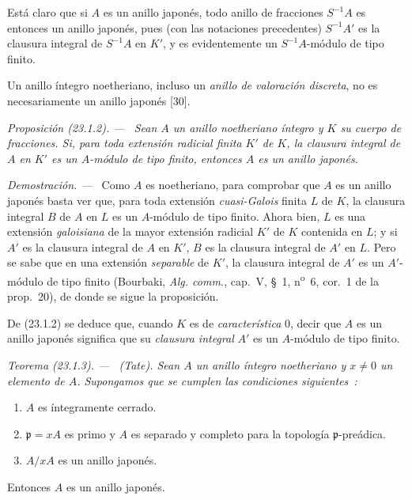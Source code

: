 \documentclass[10pt,oneside]{book}
\makeatletter
\newcommand{\setmanualcurrentlabel}[1]{\def\@currentlabel{#1}}
\newenvironment{proposition}[1][]{%
  \setmanualcurrentlabel{#1}\par\medskip\noindent\itshape Proposición (#1). ---\ }{\par}
\newenvironment{theorem}[1][]{%
  \setmanualcurrentlabel{#1}\par\medskip\noindent\itshape Teorema (#1). ---\ }{\par}
\newenvironment{proof}{%
  \par\medskip\noindent\textit{Demostración. ---\ }}{\par}
\makeatother
\begin{document}
Está claro que si $A$ es un anillo japonés, todo anillo de fracciones
$S^{-1}A$ es entonces un anillo japonés, pues (con las notaciones precedentes)
$S^{-1}A'$ es la clausura integral de $S^{-1}A$ en $K'$, y es
evidentemente un $S^{-1}A$-módulo de tipo finito.

Un anillo íntegro noetheriano, incluso un \emph{anillo de valoración discreta},
no es necesariamente un anillo japonés [30].

\begin{proposition}[23.1.2]
\label{0.23.1.2-es}
Sean $A$ un anillo noetheriano íntegro y $K$ su cuerpo de fracciones. Si, para
toda extensión \textup{radicial} finita $K'$ de $K$, la clausura integral de $A$
en $K'$ es un $A$-módulo de tipo finito, entonces $A$ es un anillo japonés.
\end{proposition}

\begin{proof}
Como $A$ es noetheriano, para comprobar que $A$ es un anillo japonés basta
ver que, para toda extensión \emph{cuasi-Galois} finita $L$ de $K$, la clausura
integral $B$ de $A$ en $L$ es un $A$-módulo de tipo
finito. Ahora bien, $L$ es
una extensión \emph{galoisiana} de la mayor extensión radicial $K'$ de $K$ contenida
en $L$; y si $A'$ es la clausura integral de $A$ en $K'$, $B$ es la clausura
integral de $A'$ en $L$. Pero se sabe que en una extensión \emph{separable} de $K'$,
la clausura integral de $A'$ es un $A'$-módulo de tipo finito (Bourbaki,
\emph{Alg. comm.}, cap.~V, §~1, n\textsuperscript{o}~6, cor.~1 de la
prop.~20), de donde se sigue la proposición.
\end{proof}

De (23.1.2) se deduce que, cuando $K$ es de \emph{característica} $0$, decir que
$A$ es un anillo japonés significa que su \emph{clausura integral} $A'$ es
un $A$-módulo de tipo finito.

\begin{theorem}[23.1.3]
\label{0.23.1.3-es}
\textnormal{(Tate).} Sean $A$ un anillo íntegro noetheriano y $x\neq0$ un
elemento de $A$. Supongamos que se cumplen las condiciones siguientes~:
\begin{enumerate}
  \item[\textup{(i)}] $A$ es íntegramente cerrado.
  \item[\textup{(ii)}] $\mathfrak p=xA$ es primo y $A$ es separado y completo para
  la topología $\mathfrak p$-preádica.
  \item[\textup{(iii)}] $A/xA$ es un anillo japonés.
\end{enumerate}
Entonces $A$ es un anillo japonés.
\end{theorem}
\end{document}
